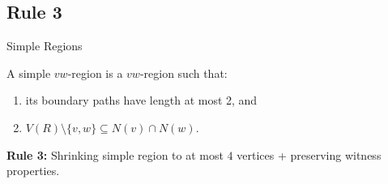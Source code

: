 \subsection{Rule 3}
\begin{frame}[c]{Simple Regions}

    \begin{tcolorbox}[colback=TUMBlueLighter,title=Simple Region {\cite{Garnero2018}}]
        A simple $vw$-region is a $vw$-region such that:
        \begin{enumerate}
            \item its boundary paths have length at most 2, and
            \item $V(R) \setminus \{v,w\} \subseteq N(v) \cap N(w)$.
        \end{enumerate}
    \end{tcolorbox}

    \pause\begin{figure}[!ht]
    \end{figure}

    \textbf{Rule 3:} Shrinking simple region to at most $4$ vertices + preserving witness properties.

\end{frame}


%
%
%
%
%
%
%
%
%


